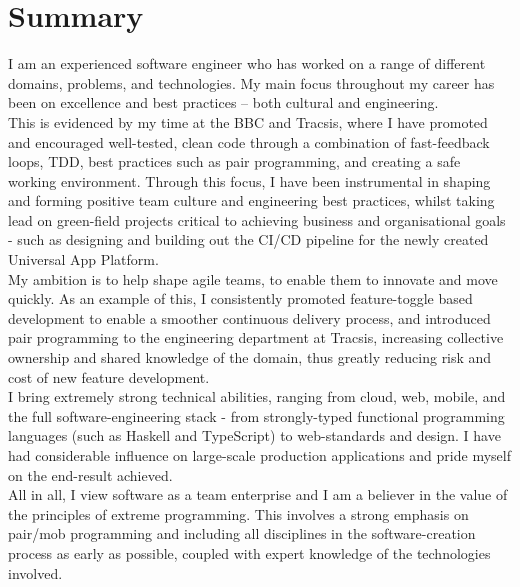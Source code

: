 \section{Summary}

I am an experienced software engineer who has worked on a range of different domains, problems, and technologies. My main focus throughout my career has been on excellence and best practices – both cultural and engineering.\\

This is evidenced by my time at the BBC and Tracsis, where I have promoted and encouraged well-tested, clean code through a combination of fast-feedback loops, TDD, best practices such as pair programming, and creating a safe working environment. Through this focus, I have been instrumental in shaping and forming positive team culture and engineering best practices, whilst taking lead on green-field projects critical to achieving business and organisational goals - such as designing and building out the CI/CD pipeline for the newly created Universal App Platform.\\

My ambition is to help shape agile teams, to enable them to innovate and move quickly. As an example of this, I consistently promoted feature-toggle based development to enable a smoother continuous delivery process, and introduced pair programming to the engineering department at Tracsis, increasing collective ownership and shared knowledge of the domain, thus greatly reducing risk and cost of new feature development.\\

I bring extremely strong technical abilities, ranging from cloud, web, mobile, and the full software-engineering stack - from strongly-typed functional programming languages (such as Haskell and TypeScript) to web-standards and design. I have had considerable influence on large-scale production applications and pride myself on the end-result achieved.\\

All in all, I view software as a team enterprise and I am a believer in the value of the principles of extreme programming. This involves a strong emphasis on pair/mob programming and including all disciplines in the software-creation process as early as possible, coupled with expert knowledge of the technologies involved.\\
